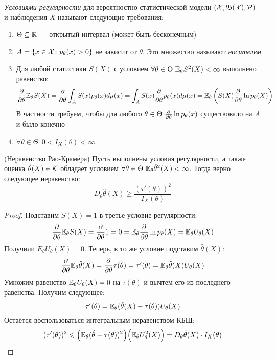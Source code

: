 \begin{definition}
	\textit{Условиями регулярности} для вероятностно-статистической модели $(\mathcal{X}, \mathfrak{B}(\mathcal{X}), \mathcal{P})$ и наблюдения $X$ называют следующие требования:
	\begin{enumerate}
		\item $\Theta \subseteq \mathbb{R}$ --- открытый интервал (может быть бесконечным)
		
		\item $A = \{x \in \mathcal{X} \colon p_\theta(x) > 0\}$ не зависит от $\theta$. Это множество называют \textit{носителем}
		
		\item Для любой статистики $S(X)$ с условием $\forall \theta \in \Theta\ \E_\theta S^2(X) < \infty$ выполнено равенство:
		\[
			\frac{\partial }{\partial \theta} \mathbb{E}_\theta S(X) = \frac{\partial }{\partial \theta} \int_A S(x)p_\theta(x)d\mu(x) = \int_A S(x)\frac{\partial }{\partial \theta} p_\theta(x)d\mu(x) = \mathbb{E}_\theta \left(S(X)\frac{\partial }{\partial \theta}\ln p_\theta(X)\right)
		\]
		В частности требуем, чтобы для любого $\theta \in \Theta\ \frac{\partial }{\partial \theta}\ln p_\theta(x)$ существовало на $A$ и было конечно
		
		\item $\forall \theta \in \Theta\ \ 0 < I_X(\theta) < \infty$
	\end{enumerate}
\end{definition}

\begin{theorem} (Неравенство Рао-Крам\'{е}ра)
	Пусть выполнены условия регулярности, а также оценка $\hat{\theta}(X) \in \mathcal{K}$ обладает условием $\forall \theta \in \Theta\ \E_\theta \hat{\theta}^2(X) < \infty$. Тогда верно следующее неравенство:
	\[
		D_\theta \hat{\theta}(X) \ge \frac{(\tau'(\theta))^2}{I_X(\theta)}
	\]
\end{theorem}

\begin{proof}
	Подставим $S(X) = 1$ в третье условие регулярности:
	\[
		\frac{\partial }{\partial \theta} \mathbb{E}_\theta S(X) = \frac{\partial }{\partial \theta} 1 = 0 = \mathbb{E}_\theta \frac{\partial }{\partial \theta} \ln p_\theta(X) = \mathbb{E}_\theta U_\theta(X)
	\]
	Получили $E_\theta U_\theta(X) = 0$. Теперь, в то же условие подставим $\hat{\theta}(X)$:
	\[
		\frac{\partial }{\partial \theta} \mathbb{E}_\theta \hat{\theta}(X) = \frac{\partial }{\partial \theta} \tau(\theta) = \tau'(\theta) = \mathbb{E}_\theta \hat{\theta}(X)U_\theta(X)
	\]
	Умножим равенство $\mathbb{E}_\theta U_\theta(X) = 0$ на $\tau(\theta)$ и вычтем его из последнего равенства. Получим следующее:
	\[
		\tau'(\theta) = \mathbb{E}_\theta (\hat{\theta}(X) - \tau(\theta))U_\theta(X)
	\]
	Остаётся воспользоваться интегральным неравенством КБШ:
	\[
		(\tau'(\theta))^2 \leqslant \Big(\mathbb{E}_\theta (\hat{\theta} - \tau(\theta))^2\Big)\Big(\mathbb{E}_\theta U_\theta^2(X)\Big) = D_\theta \hat{\theta}(X) \cdot I_X(\theta)
	\]
\end{proof}

